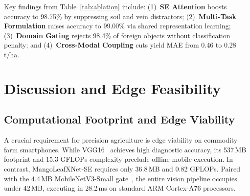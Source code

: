 \documentclass[conference]{IEEEtran}
\begin{document}
\begin{table}[!htbp]
\caption{Systematic Ablation Study Across Framework Components}
\label{tab:ablation}
\centering
{}
\end{table}

Key findings from Table~\ref{tab:ablation} include: (1)~\textbf{SE Attention} boosts accuracy to 98.75\% by suppressing soil and vein distractors; (2)~\textbf{Multi-Task Formulation} raises accuracy to 99.00\% via shared representation learning; (3)~\textbf{Domain Gating} rejects 98.4\% of foreign objects without classification penalty; and (4)~\textbf{Cross-Modal Coupling} cuts yield MAE from 0.46 to 0.28\,t/ha.

\section{Discussion and Edge Feasibility}

\subsection{Computational Footprint and Edge Viability}
A crucial requirement for precision agriculture is edge viability on commodity farm smartphones. While VGG16~\cite{simonyan2014very} achieves high diagnostic accuracy, its 537\,MB footprint and 15.3 GFLOPs complexity preclude offline mobile execution. In contrast, MangoLeafXNet-SE requires only 36.8\,MB and 0.82 GFLOPs. Paired with the 4.4\,MB MobileNetV3-Small gate~\cite{howard2019searching}, the entire vision pipeline occupies under 42\,MB, executing in 28.2\,ms on standard ARM Cortex-A76 processors.
\end{document}
